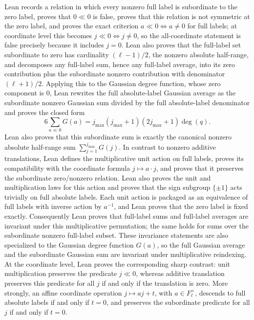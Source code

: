 \documentclass[11pt]{article}
\begin{document}
\begin{itemize}
  Lean records a relation in which every nonzero full label is subordinate to
  the zero label, proves that \(0\ll0\) is false, proves that this relation
  is not symmetric at the zero label, and proves the exact criterion
  \(a\ll0\iff a\ne0\) for full labels; at coordinate level this becomes
  \(j\ll0\iff j\ne0\), so the all-coordinate statement is false precisely
  because it includes \(j=0\).  Lean also proves that the full-label set
  subordinate to zero has cardinality \((\ell-1)/2\), the nonzero absolute
  half-range, and decomposes any full-label sum, hence any full-label average,
  into its zero contribution plus the subordinate nonzero contribution with
  denominator \((\ell+1)/2\).  Applying this to the Gaussian degree function,
  whose zero component is \(0\), Lean rewrites the full absolute-label
  Gaussian average as the subordinate nonzero Gaussian sum divided by the full
  absolute-label denominator and proves the closed form
  \[
    6\sum_{a\ll0}G(a)
    =j_{\max}(j_{\max}+1)(2j_{\max}+1)\deg(q).
  \]
  Lean also proves that this subordinate sum is exactly the canonical
  nonzero absolute half-range sum \(\sum_{j=1}^{j_{\max}}G(j)\).
  In contrast to nonzero additive translations, Lean defines the multiplicative
  unit action on full labels, proves its compatibility with the coordinate
  formula \(j\mapsto a\cdot j\), and proves that it preserves the subordinate
  zero/nonzero relation.  Lean also proves the unit and multiplication laws for
  this action and proves that the sign subgroup \(\{\pm1\}\) acts trivially on
  full absolute labels.  Each unit action is packaged as an equivalence of
  full labels with inverse action by \(a^{-1}\), and Lean proves that the zero
  label is fixed exactly.  Consequently Lean proves that full-label sums and
  full-label averages are invariant under this multiplicative permutation; the
  same holds for sums over the subordinate nonzero full-label subset.  These
  invariance statements are also specialized to the Gaussian degree function
  \(G(a)\), so the full Gaussian average and the subordinate Gaussian sum are
  invariant under multiplicative reindexing.  At the coordinate level, Lean
  proves the corresponding sharp contrast: unit multiplication preserves the
  predicate \(j\ll0\), whereas additive translation preserves this predicate
  for all \(j\) if and only if the translation is zero.  More strongly, an
  affine coordinate operation \(j\mapsto a j+t\), with \(a\in F_\ell^\times\),
  descends to full absolute labels if and only if \(t=0\), and preserves the
  subordinate predicate for all \(j\) if and only if \(t=0\).

\end{itemize}
\end{document}
